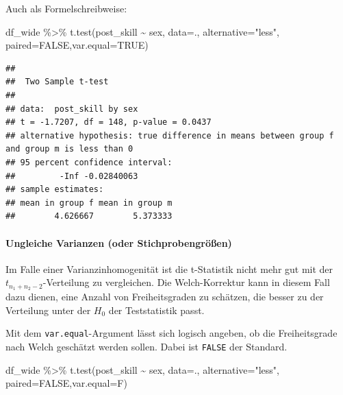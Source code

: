 \documentclass[
]{book}
\newenvironment{Shaded}{\begin{snugshade}}{\end{snugshade}}
\newcommand{\AttributeTok}[1]{\textcolor[rgb]{0.77,0.63,0.00}{#1}}
\newcommand{\ConstantTok}[1]{\textcolor[rgb]{0.00,0.00,0.00}{#1}}
\newcommand{\FunctionTok}[1]{\textcolor[rgb]{0.00,0.00,0.00}{#1}}
\newcommand{\NormalTok}[1]{#1}
\newcommand{\SpecialCharTok}[1]{\textcolor[rgb]{0.00,0.00,0.00}{#1}}
\newcommand{\StringTok}[1]{\textcolor[rgb]{0.31,0.60,0.02}{#1}}
\begin{document}
Auch als Formelschreibweise:

\begin{Shaded}
\begin{Highlighting}[]
\NormalTok{df\_wide }\SpecialCharTok{\%\textgreater{}\%} 
  \FunctionTok{t.test}\NormalTok{(post\_skill }\SpecialCharTok{\textasciitilde{}}\NormalTok{ sex, }\AttributeTok{data=}\NormalTok{., }
       \AttributeTok{alternative=}\StringTok{"less"}\NormalTok{, }\AttributeTok{paired=}\ConstantTok{FALSE}\NormalTok{,}\AttributeTok{var.equal=}\ConstantTok{TRUE}\NormalTok{)}
\end{Highlighting}
\end{Shaded}

\begin{verbatim}
## 
##  Two Sample t-test
## 
## data:  post_skill by sex
## t = -1.7207, df = 148, p-value = 0.0437
## alternative hypothesis: true difference in means between group f and group m is less than 0
## 95 percent confidence interval:
##         -Inf -0.02840063
## sample estimates:
## mean in group f mean in group m 
##        4.626667        5.373333
\end{verbatim}

\hypertarget{ungleiche-varianzen-oder-stichprobengruxf6uxdfen}{%
\paragraph{Ungleiche Varianzen (oder Stichprobengrößen)}\label{ungleiche-varianzen-oder-stichprobengruxf6uxdfen}}

Im Falle einer Varianzinhomogenität ist die t-Statistik nicht mehr gut mit der \(t_{n_1 + n_2 - 2}\)-Verteilung zu vergleichen. Die Welch-Korrektur kann in diesem Fall dazu dienen, eine Anzahl von Freiheitsgraden zu schätzen, die besser zu der Verteilung unter der \(H_0\) der Teststatistik passt.

Mit dem \texttt{var.equal}-Argument lässt sich logisch angeben, ob die Freiheitsgrade nach Welch geschätzt werden sollen. Dabei ist \texttt{FALSE} der Standard.

\begin{Shaded}
\begin{Highlighting}[]
\NormalTok{df\_wide }\SpecialCharTok{\%\textgreater{}\%} 
  \FunctionTok{t.test}\NormalTok{(post\_skill }\SpecialCharTok{\textasciitilde{}}\NormalTok{ sex, }\AttributeTok{data=}\NormalTok{., }
       \AttributeTok{alternative=}\StringTok{"less"}\NormalTok{, }\AttributeTok{paired=}\ConstantTok{FALSE}\NormalTok{,}\AttributeTok{var.equal=}\NormalTok{F)}
\end{Highlighting}
\end{Shaded}
\end{document}
